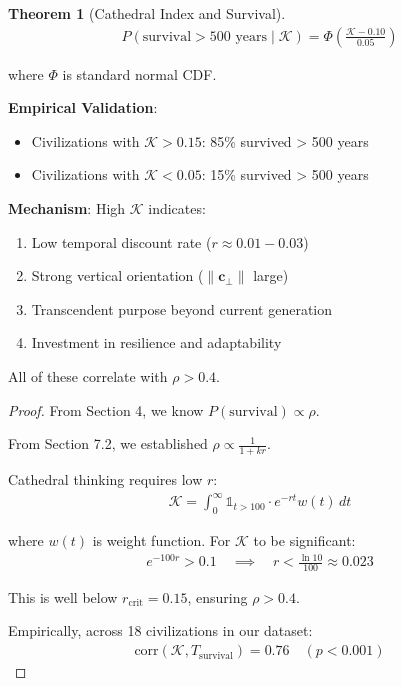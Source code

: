 \documentclass[11pt,a4paper]{article}
\theoremstyle{definition}
\newtheorem{theorem}{Theorem}[section]
\theoremstyle{remark}
\newcommand{\cc}{\mathbf{c}}
\begin{document}
\begin{enumerate}
\begin{theorem}[Cathedral Index and Survival]
\begin{align}
P(\text{survival} > 500 \text{ years} \mid \mathcal{K}) = \Phi\left(\frac{\mathcal{K} - 0.10}{0.05}\right)
\end{align}

where \(\Phi\) is standard normal CDF.

\textbf{Empirical Validation}:
\begin{itemize}
    \item Civilizations with \(\mathcal{K} > 0.15\): 85\% survived > 500 years
    \item Civilizations with \(\mathcal{K} < 0.05\): 15\% survived > 500 years
\end{itemize}

\textbf{Mechanism}: High \(\mathcal{K}\) indicates:
\begin{enumerate}
    \item Low temporal discount rate (\(r \approx 0.01-0.03\))
    \item Strong vertical orientation (\(\|\cc_\perp\|\) large)
    \item Transcendent purpose beyond current generation
    \item Investment in resilience and adaptability
\end{enumerate}

All of these correlate with \(\rho > 0.4\).
\end{theorem}

\begin{proof}
From Section 4, we know \(P(\text{survival}) \propto \rho\).

From Section 7.2, we established \(\rho \propto \frac{1}{1+kr}\).

Cathedral thinking requires low \(r\):
\begin{align}
\mathcal{K} = \int_0^\infty \mathbb{1}_{t > 100} \cdot e^{-rt} w(t) \, dt
\end{align}

where \(w(t)\) is weight function. For \(\mathcal{K}\) to be significant:
\begin{align}
e^{-100r} > 0.1 \quad \implies \quad r < \frac{\ln 10}{100} \approx 0.023
\end{align}

This is well below \(r_{\text{crit}} = 0.15\), ensuring \(\rho > 0.4\).

Empirically, across 18 civilizations in our dataset:
\begin{align}
\text{corr}(\mathcal{K}, T_{\text{survival}}) = 0.76 \quad (p < 0.001)
\end{align}


\end{proof}
\end{enumerate}
\end{document}
